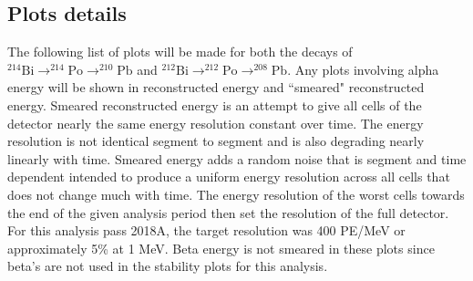 \subsection{Plots details}
The following list of plots will be made for both the decays of $^{214}\textrm{Bi}\rightarrow^{214}\textrm{Po}\rightarrow^{210}\textrm{Pb}$ and $^{212}\textrm{Bi}\rightarrow^{212}\textrm{Po}\rightarrow^{208}\textrm{Pb}$. Any plots involving alpha energy will be shown in reconstructed energy and ``smeared" reconstructed energy. Smeared reconstructed energy is an attempt to give all cells of the detector nearly the same energy resolution constant over time. The energy resolution is not identical segment to segment and is also degrading nearly linearly with time. Smeared energy adds a random noise that is segment and time dependent intended to produce a uniform energy resolution across all cells that does not change much with time. The energy resolution of the worst cells towards the end of the given analysis period then set the resolution of the full detector. For this analysis pass 2018A, the target resolution was 400 PE/MeV or approximately 5\% at 1 MeV. Beta energy is not smeared in these plots since beta's are not used in the stability plots for this analysis.
